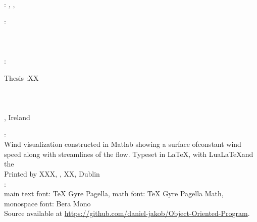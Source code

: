 \thispagestyle{empty}

\hfill

\vfill

\noindent\myName: \textit{\myTitle,} \mySubtitle, %
\textcopyright\ ~

\bigskip

\noindent{}: \\
\myProf \\
\myOtherProf \\
\mySupervisor \\
\noindent{}:\\
\myExaminer

\bigskip
\noindent\myDegree Thesis :XX\\
\noindent\myDepartment\\
\noindent\myFaculty\\
\noindent\myUni\\
\noindent\myLocation, Ireland

\vfill


\noindent{}: \\
Wind visualization constructed in Matlab showing a surface ofconstant wind speed along with streamlines of the flow.
\medskip
\noindent Typeset in \LaTeX, with Lua\LaTeX and the \ctVersion\\
\noindent Printed by XXX, , XX, Dublin\\
\noindent{}: \\
\noindent main text font: TeX Gyre Pagella, math font: TeX Gyre Pagella Math, monospace font: Bera Mono\\
\noindent Source available at \url{https://github.com/daniel-jakob/Object-Oriented-Program}.
